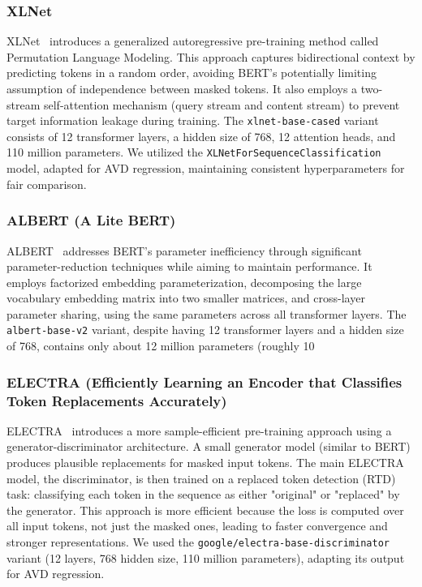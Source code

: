 \documentclass[12pt]{article}
\begin{document}
\subsubsection{XLNet}
XLNet~\cite{yang2019xlnet} introduces a generalized autoregressive pre-training method called Permutation Language Modeling. This approach captures bidirectional context by predicting tokens in a random order, avoiding BERT's potentially limiting assumption of independence between masked tokens. It also employs a two-stream self-attention mechanism (query stream and content stream) to prevent target information leakage during training. The \texttt{xlnet-base-cased} variant consists of 12 transformer layers, a hidden size of 768, 12 attention heads, and 110 million parameters. We utilized the \texttt{XLNetForSequenceClassification} model, adapted for AVD regression, maintaining consistent hyperparameters for fair comparison.

\subsubsection{ALBERT (A Lite BERT)}
ALBERT~\cite{lan2019albert} addresses BERT's parameter inefficiency through significant parameter-reduction techniques while aiming to maintain performance. It employs factorized embedding parameterization, decomposing the large vocabulary embedding matrix into two smaller matrices, and cross-layer parameter sharing, using the same parameters across all transformer layers. The \texttt{albert-base-v2} variant, despite having 12 transformer layers and a hidden size of 768, contains only about 12 million parameters (roughly 10%

\subsubsection{ELECTRA (Efficiently Learning an Encoder that Classifies Token Replacements Accurately)}
ELECTRA~\cite{clark2020electra} introduces a more sample-efficient pre-training approach using a generator-discriminator architecture. A small generator model (similar to BERT) produces plausible replacements for masked input tokens. The main ELECTRA model, the discriminator, is then trained on a replaced token detection (RTD) task: classifying each token in the sequence as either "original" or "replaced" by the generator. This approach is more efficient because the loss is computed over all input tokens, not just the masked ones, leading to faster convergence and stronger representations. We used the \texttt{google/electra-base-discriminator} variant (12 layers, 768 hidden size, 110 million parameters), adapting its output for AVD regression.
\end{document}
